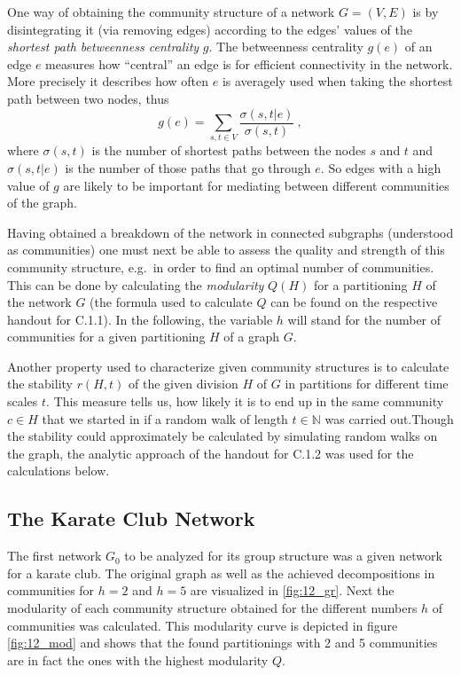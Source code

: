 \documentclass{scrartcl}
\begin{document}
One way of obtaining the community structure of a network $G = (V,E)$ is by
disintegrating it (via removing edges) according to the edges' values of
the \emph{shortest path betweenness centrality} $g$. The betweenness
centrality $g(e)$ of an edge $e$ measures how \enquote{central} an edge is
for efficient connectivity in the network. More precisely it describes how
often $e$ is averagely used when taking the shortest path between two
nodes, thus
\begin{equation}\label{eq:betweenness}
    g(e) = \sum_{s,t\in V} \frac{\sigma(s,t | e)}{\sigma(s,t)}~,
\end{equation}
where $\sigma(s,t)$ is the number of shortest paths between the nodes $s$
and $t$ and $\sigma(s,t |e)$ is the number of those paths that go through
$e$. So edges with a high value of $g$ are likely to be important for
mediating between different communities of the graph.

Having obtained a breakdown of the network in connected subgraphs
(understood as communities) one must next be able to assess the quality and
strength of this community structure, e.g.\ in order to find an optimal
number of communities. This can be done by calculating the
\emph{modularity} $Q(H)$ for a partitioning $H$ of the network $G$ (the
formula used to calculate $Q$ can be found on the respective handout for
C.1.1).
In the following, the variable $h$ will stand for the number of communities
for a given partitioning $H$ of a graph $G$.

Another property used to characterize given community structures is to
calculate the stability $r(H, t)$ of the given division $H$ of $G$ in
partitions for different time scales $t$. This measure tells us, how likely
it is to end up in the same community $c\in H$ that we started in if
a random walk of length $t\in\mathbb{N}$ was carried out.Though the
stability could approximately be calculated by simulating random walks on
the graph, the analytic approach of the handout for C.1.2 was used for the
calculations below.


\subsection{The Karate Club Network}
The first network $G_0$ to be analyzed for its group structure was a given
network for a karate club. The original graph as well as the achieved
decompositions in communities for $h=2$ and $h=5$ are visualized in
\ref{fig:12_gr}.
Next the modularity of each community structure obtained for the different
numbers $h$ of communities was calculated. This modularity curve is
depicted in figure \ref{fig:12_mod} and shows that the found partitionings
with 2 and 5 communities are in fact the ones with the highest modularity
$Q$.
\end{document}
